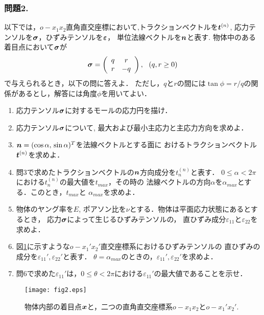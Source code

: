 \documentclass[10pt,a4j]{jarticle}
\begin{document}
\subsubsection*{問題2.}
以下では，$o-x_1x_2$直角直交座標において,トラクションベクトルを$\mbox{\boldmath $t$}^{(n)}$, 
応力テンソルを$\mbox{\boldmath $\sigma$}$，ひずみテンソルを$\mbox{\boldmath $\varepsilon$}$，
単位法線ベクトルを$\mbox{\boldmath $n$}$と表す.
物体中のある着目点において$\mbox{\boldmath $\sigma$}$が
\[
	\mbox{\boldmath $\sigma$}=
	\left(
	\begin{array}{cc}
		q &  r \\
		r & -q 
	\end{array}
	\right), \ \ (q,r \geq 0)
\]
で与えられるとき，以下の問に答えよ．
ただし，$q$と$r$の間には$\tan\phi =r/q$の関係があるとし，解答には角度$\phi$を用いてよい．
\begin{enumerate}
\item
	応力テンソル$\mbox{\boldmath $\sigma$}$に対するモールの応力円を描け．
\item
	応力テンソル$\mbox{\boldmath $\sigma$}$について, 最大および最小主応力と主応力方向を求めよ．
\item
	$\mbox{\boldmath $n$}=(\cos\alpha,\, \sin\alpha)^T$を法線ベクトルとする面に
	おけるトラクションベクトル$\mbox{\boldmath $t$}^{(n)}$を求めよ．
\item
	問3で求めたトラクションベクトルの$\mbox{\boldmath $n$}$方向成分を$t^{(n)}_n$と表す．
	$0\leq \alpha < 2\pi$における$t^{(n)}_n$の最大値を$t_{max}$，その時の
	法線ベクトルの方向$\alpha$を$\alpha_{max}$とする．このとき，$t_{max}$と
	$\alpha_{max}$を求めよ．
\item
	物体のヤング率を$E$, ポアソン比を$\nu$とする．物体は平面応力状態にあるとするとき，
	応力$\mbox{\boldmath $\sigma$}$によって生じるひずみテンソルの，
	直ひずみ成分$\varepsilon_{11}$と$\varepsilon_{22}$を求めよ．
\item
	図\ref{fig:fig2}に示すような$o-x_1'x_2'$直交座標系におけるひずみテンソルの
	直ひずみの成分を$\varepsilon_{11}',\varepsilon_{22}'$と表す．
	$\theta=\alpha_{max}$のときの，$\varepsilon_{11}',\varepsilon_{22}'$を求めよ．
\item
	問6で求めた$\varepsilon_{11}'$は，$0 \leq \theta < 2\pi$における$\varepsilon_{11}'$の最大値であることを示せ．
\end{enumerate}
\begin{figure}[h]
	\begin{center}
	\texttt{[image: fig2.eps]} 
	\end{center}
	\caption{物体内部の着目点$\mbox{\boldmath $x$}$と，二つの直角直交座標系$o-x_1x_2$と$o-x_1'x_2'$.} 
	\label{fig:fig2}
\end{figure}
\end{document}
